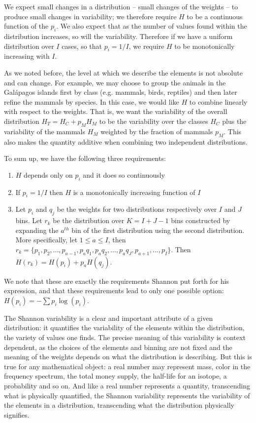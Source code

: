 \documentclass{article}
\begin{document}
We  expect small changes in a distribution -- small changes of the weights -- to produce small changes in variability; we therefore require $H$ to be a continuous function of the $p_i$. We also expect that as the number of values found within the distribution increases, so will the variability. Therefore if we have a uniform distribution over $I$ cases, so that $p_i = 1/I$, we require $H$ to be monotonically increasing with $I$.

As we noted before, the level at which we describe the elements is not absolute and can change. For example, we may choose to group the animals in the Gal\'{a}pagos islands first by class (e.g. mammals, birds, reptiles) and then later refine the mammals by species. In this case, we would like $H$ to combine linearly with respect to the weights. That is, we want the variability of the overall distribution $H_T = H_C + p_M H_M$ to be the variability over the classes $H_C$ plus the variability of the mammals $H_M$ weighted by the fraction of mammals $p_M$. This also makes the quantity additive when combining two independent distributions.

To sum up, we have the following three requirements:
\begin{enumerate}
\item $H$ depends only on $p_i$ and it does so continuously
\item If $p_i=1/I$ then $H$ is a monotonically increasing function of $I$
\item Let $p_i$ and $q_j$ be the weights for two distributions respectively over $I$ and $J$ bins. Let $r_k$ be the distribution over $K=I+J-1$ bins constructed by expanding the $a^{th}$ bin of the first distribution using the second distribution. More specifically, let $1 \leq a \leq I$, then $r_k = \{p_1, p_2, ..., p_{a-1}, p_{a}q_1, p_{a}q_2, ..., p_{a}q_J, p_{a+1}, ..., p_I \}$. Then $H(r_k) = H(p_i) + p_{a} H(q_j)$.
\end{enumerate}
We note that these are exactly the requirements Shannon put forth for his expression\cite{Shannon}, and that these requirements lead to only one possible option: $H(p_i) = - \sum p_i \log(p_i)$.

The Shannon variability is a clear and important attribute of a given distribution: it quantifies the variability of the elements within the distribution, the variety of values one finds. The precise meaning of this variability is context dependent, as the choices of the elements and binning are not fixed and the meaning of the weights depends on what the distribution is describing. But this is true for any mathematical object: a real number may represent mass, color in the frequency spectrum, the total money supply, the half-life for an isotope, a probability and so on. And like a real number represents a quantity, transcending what is physically quantified, the Shannon variability represents the variability of the elements in a distribution, transcending what the distribution physically signifies.
\end{document}
